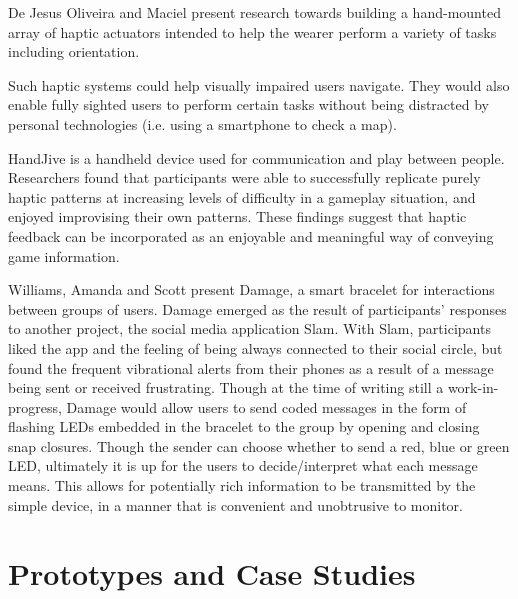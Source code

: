 \documentclass{chi-ext}
\begin{document}
De Jesus Oliveira and Maciel \cite{Jesus-Oliveira:2013aa} present research towards building a hand-mounted array of haptic actuators intended to help the wearer perform a variety of tasks including orientation. 


Such haptic systems could help visually impaired users navigate. They would also enable fully sighted users to perform certain tasks without being distracted by personal technologies (i.e. using a smartphone to check a map).

\cite{fogg1998handjive}HandJive is a handheld device used for communication and play between people. Researchers found that participants were able to successfully replicate purely haptic patterns at increasing levels of difficulty in a gameplay situation, and enjoyed improvising their own patterns. These findings suggest that haptic feedback can be incorporated as an enjoyable and meaningful way of conveying game information.

\cite{williams2006exploring}Williams, Amanda and Scott present Damage, a smart bracelet for interactions between groups of users. Damage emerged as the result of participants' responses to another project, the social media application Slam. With Slam, participants liked the app and the feeling of being always connected to their social circle, but found the frequent vibrational alerts from their phones as a result of a message being sent or received frustrating. Though at the time of writing still a work-in-progress, Damage would allow users to send coded messages in the form of flashing LEDs embedded in the bracelet to the group by opening and closing snap closures. Though the sender can choose whether to send a red, blue or green LED, ultimately it is up for the users to decide/interpret what each message means. This allows for potentially rich information to be transmitted by the simple device, in a manner that is convenient and unobtrusive to monitor.

\section{Prototypes and Case Studies}
\end{document}
